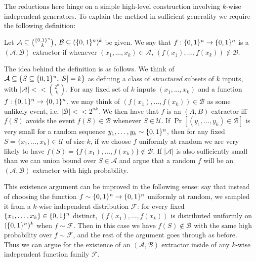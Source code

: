 The reductions here hinge on a simple high-level construction involving $k$-wise independent generators. To explain the method in sufficient generality we require the following definition:
\begin{definition}\label{range:def:ab-extractor}
Let $\mathcal{A} \subseteq \binom{\{0,1\}^n}{k}$, $\mathcal{B} \subseteq (\{0,1\}^{n})^k$ be given. We say that $f: \{0,1\}^n \to \{0,1\}^n$ is a $(\mathcal{A},\mathcal{B})$ extractor if whenever $(x_1,\ldots,x_k) \in \mathcal{A}$, $(f(x_1),\ldots, f(x_k)) \notin \mathcal{B}$.
\end{definition}
The idea behind the definition is as follows. We think of $\mathcal{A} \subseteq \{S \subseteq \{0,1\}^n, |S| = k\}$ as defining a class of \emph{structured} subsets of $k$ inputs, with $|\mathcal{A}| << \binom{2^n}{k}$. For any fixed set of $k$ inputs $(x_1,\ldots,x_k)$ and a function $f: \{0,1\}^n \to \{0,1\}^n$, we may think of $(f(x_1),\ldots,f(x_k)) \in \mathcal{B}$ as some unlikely event, i.e. $|\mathcal{B}| << 2^{nk}$. We then have that $f$ is an $(A,B)$ extractor iff $f(S)$ avoids the event $f(S) \in \mathcal{B}$ whenever $S \in \mathcal{U}$. If $\Pr[(y_1,\ldots,y_k) \in \mathcal{B}]$ is very small for a random sequence $y_1,\ldots,y_k \sim \{0,1\}^n$, then for any fixed $S = \{x_1,\ldots,x_k\} \in \mathcal{U}$ of size $k$, if we choose $f$ uniformly at random we are very likely to have $f(S) = \{f(x_1),\ldots,f(x_k)\} \notin \mathcal{B}$. If $|\mathcal{A}|$ is also sufficiently small than we can union bound over $S \in \mathcal{A}$ and argue that a random $f$ will be an $(\mathcal{A},\mathcal{B})$ extractor with high probability. 

This existence argument can be improved in the following sense: say that instead of choosing the function $f \sim \{0,1\}^n \to \{0,1\}^n$ uniformly at random, we sampled it from a $k$-wise independent distribution $\mathcal{F}$: for every fixed $\{x_1,\ldots,x_k\} \in \{0,1\}^n$ distinct, $(f(x_1),\ldots,f(x_k))$ is distributed uniformly on $(\{0,1\}^{n})^k$ when $f \sim \mathcal{F}$. Then in this case we have $f(S) \notin \mathcal{B}$ with the same high probability over $f \sim \mathcal{F}$, and the rest of the argument goes through as before. Thus we can argue for the existence of an $(\mathcal{A},\mathcal{B})$ extractor inside of any $k$-wise independent function family $\mathcal{F}$.

